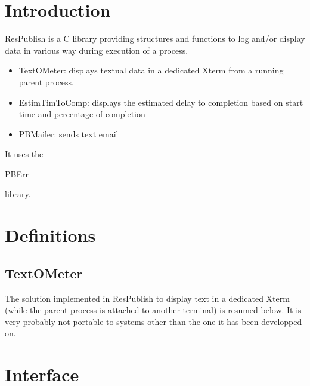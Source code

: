 \section*{Introduction}

ResPublish is a C library providing structures and functions to log and/or display data in various way during execution of a process.\\ 

\begin{itemize}
\item TextOMeter: displays textual data in a dedicated Xterm from a running parent process.
\item EstimTimToComp: displays the estimated delay to completion based on start time and percentage of completion
\item PBMailer: sends text email
\end{itemize}

It uses the \begin{ttfamily}PBErr\end{ttfamily} library.\\

\section{Definitions}

\subsection{TextOMeter}

The solution implemented in ResPublish to display text in a dedicated Xterm (while the parent process is attached to another terminal) is resumed below. It is very probably not portable to systems other than the one it has been developped on.\\
\begin{scriptsize}
\begin{ttfamily}

\end{ttfamily}
\end{scriptsize}

\section{Interface}

\begin{scriptsize}
\begin{ttfamily}

\end{ttfamily}
\end{scriptsize}

